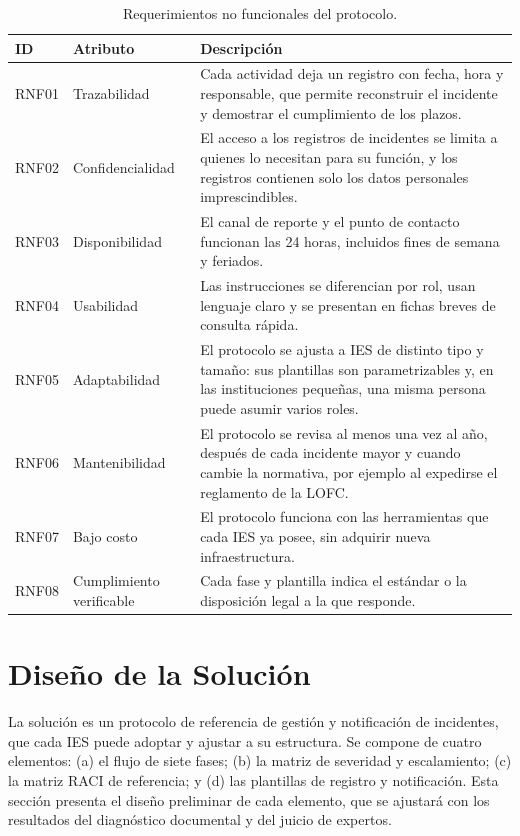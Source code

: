 \begin{table}[htbp]
  \centering
  \caption{Requerimientos no funcionales del protocolo.}
  \label{tab:requerimientos_no_funcionales}
  \small
  \begin{tabular}{|L{\tabcolsep}|L{\tabcolsep}|L{\tabcolsep}|}
    \hline
    \textbf{ID} & \textbf{Atributo} & \textbf{Descripción} \\
    \hline
    RNF01 & Trazabilidad & Cada actividad deja un registro con fecha, hora y responsable, que permite reconstruir el incidente y demostrar el cumplimiento de los plazos. \\
    \hline
    RNF02 & Confidencialidad & El acceso a los registros de incidentes se limita a quienes lo necesitan para su función, y los registros contienen solo los datos personales imprescindibles. \\
    \hline
    RNF03 & Disponibilidad & El canal de reporte y el punto de contacto funcionan las 24 horas, incluidos fines de semana y feriados. \\
    \hline
    RNF04 & Usabilidad & Las instrucciones se diferencian por rol, usan lenguaje claro y se presentan en fichas breves de consulta rápida. \\
    \hline
    RNF05 & Adaptabilidad & El protocolo se ajusta a IES de distinto tipo y tamaño: sus plantillas son parametrizables y, en las instituciones pequeñas, una misma persona puede asumir varios roles. \\
    \hline
    RNF06 & Mantenibilidad & El protocolo se revisa al menos una vez al año, después de cada incidente mayor y cuando cambie la normativa, por ejemplo al expedirse el reglamento de la LOFC. \\
    \hline
    RNF07 & Bajo costo & El protocolo funciona con las herramientas que cada IES ya posee, sin adquirir nueva infraestructura. \\
    \hline
    RNF08 & Cumplimiento verificable & Cada fase y plantilla indica el estándar o la disposición legal a la que responde. \\
    \hline
  \end{tabular}
  \par\normalsize\raggedright
\end{table}

\section{Diseño de la Solución}
\label{sec:diseno_solucion}
La solución es un protocolo de referencia de gestión y notificación de incidentes, que cada IES puede adoptar y ajustar a su estructura. Se compone de cuatro elementos: (a) el flujo de siete fases; (b) la matriz de severidad y escalamiento; (c) la matriz RACI de referencia; y (d) las plantillas de registro y notificación. Esta sección presenta el diseño preliminar de cada elemento, que se ajustará con los resultados del diagnóstico documental y del juicio de expertos.

